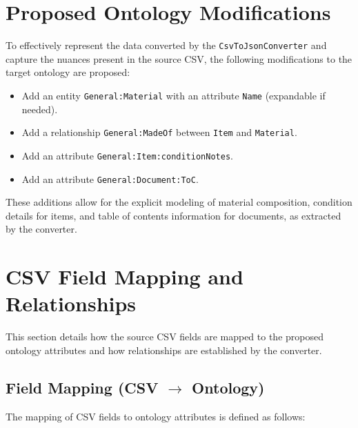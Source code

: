 \documentclass[11pt, a4paper]{article}
\begin{document}
\section{Proposed Ontology Modifications}
\label{sec:ontology}
To effectively represent the data converted by the \texttt{CsvToJsonConverter} and capture the nuances present in the source CSV, the following modifications to the target ontology are proposed:

\begin{itemize}
    \item Add an entity \texttt{General:Material} with an attribute \texttt{Name} (expandable if needed).
    \item Add a relationship \texttt{General:MadeOf} between \texttt{Item} and \texttt{Material}.
    \item Add an attribute \texttt{General:Item:conditionNotes}.
    \item Add an attribute \texttt{General:Document:ToC}.
\end{itemize}
These additions allow for the explicit modeling of material composition, condition details for items, and table of contents information for documents, as extracted by the converter.

\section{CSV Field Mapping and Relationships}
\label{sec:mapping}
This section details how the source CSV fields are mapped to the proposed ontology attributes and how relationships are established by the converter.

\subsection{Field Mapping (CSV $\rightarrow$ Ontology)}
The mapping of CSV fields to ontology attributes is defined as follows:
\end{document}
